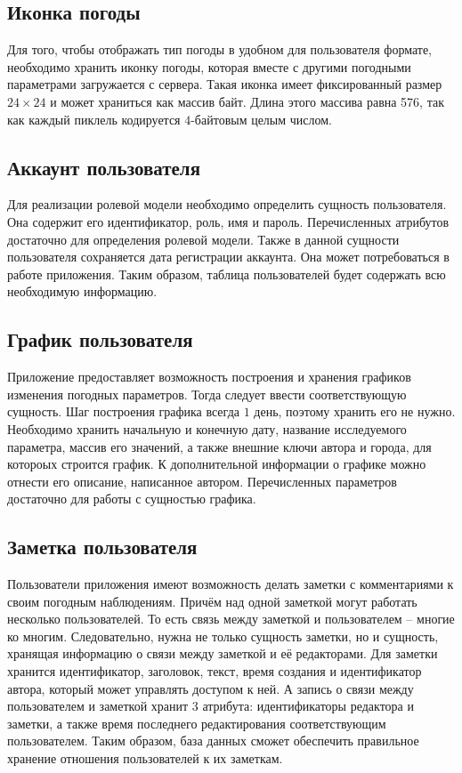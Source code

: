 \subsection*{Иконка погоды}
Для того, чтобы отображать тип погоды в удобном для пользователя формате, необходимо хранить иконку погоды, которая вместе с другими погодными параметрами загружается с сервера.
Такая иконка имеет фиксированный размер $24\times24$ и может храниться как массив байт.
Длина этого массива равна 576, так как каждый пиклель кодируется $4$-байтовым целым числом.

\subsection*{Аккаунт пользователя}
Для реализации ролевой модели необходимо определить сущность пользователя.
Она содержит его идентификатор, роль, имя и пароль.
Перечисленных атрибутов достаточно для определения ролевой модели.
Также в данной сущности пользователя сохраняется дата регистрации аккаунта.
Она может потребоваться в работе приложения.
Таким образом, таблица пользователей будет содержать всю необходимую информацию.

\subsection*{График пользователя}
Приложение предоставляет возможность построения и хранения графиков изменения погодных параметров.
Тогда следует ввести соответствующую сущность.
Шаг построения графика всегда $1$ день, поэтому хранить его не нужно.
Необходимо хранить начальную и конечную дату, название исследуемого параметра, массив его значений, а также внешние ключи автора и города, для котороых строится график.
К дополнительной информации о графике можно отнести его описание, написанное автором.
Перечисленных параметров достаточно для работы с сущностью графика.

\subsection*{Заметка пользователя}
Пользователи приложения имеют возможность делать заметки с комментариями к своим погодным наблюдениям.
Причём над одной заметкой могут работать несколько пользователей.
То есть связь между заметкой и пользователем -- многие ко многим.
Следовательно, нужна не только сущность заметки, но и сущность, хранящая информацию о связи между заметкой и её редакторами.
Для заметки хранится идентификатор, заголовок, текст, время создания и идентификатор автора, который может управлять доступом к ней.
А запись о связи между пользователем и заметкой хранит $3$ атрибута: идентификаторы редактора и заметки, а также время последнего редактирования соответствующим пользователем.
Таким образом, база данных сможет обеспечить правильное хранение отношения пользователей к их заметкам.

